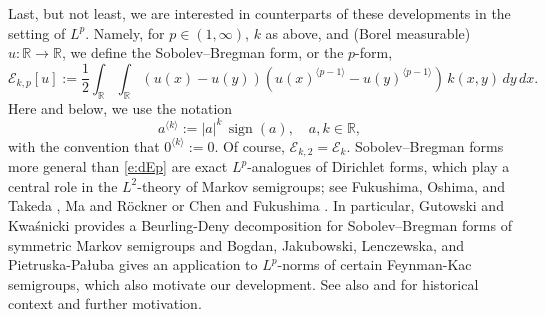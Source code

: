 \documentclass[12pt, a4paper]{amsart}
\DeclareMathOperator{\sign}{sign}
\newcommand{\R}{\mathbb{R}}
\newcommand{\E}{\mathcal{E}}
\begin{document}
Last, but not least, we are interested in counterparts of these developments in the setting of $L^p$. Namely,
for  $p \in (1, \infty)$, $k$ as above,  and (Borel measurable) $u: \R \to \R$,
we define the Sobolev--Bregman form, or the $p$-form,
\begin{equation}\label{e:dEp}
\E_{k, p}[u] :=
\frac{1}{2}
\int_{\R} \int_{\R} (u(x)-u(y)) (u(x)^{\langle p - 1 \rangle}  -u(y)^{\langle p - 1 \rangle} )\,k(x,y) \,dy \,dx.
\end{equation}
Here and below, we use the notation
\[
a^{\langle k \rangle} := |a|^k\, \sign(a), \quad a, k \in \mathbb{R},
\]
with the convention that \( 0^{\langle k \rangle} := 0 \). Of course, $\E_{k, 2}=\E_{k}$.
Sobolev--Bregman forms more general than \eqref{e:dEp} are exact \( L^p \)-analogues of Dirichlet forms, which play a central role in the \( L^2 \)-theory of Markov semigroups; see Fukushima, Oshima, and Takeda \cite{MR1303354}, Ma and Röckner \cite{MR1214375} or Chen and Fukushima \cite{MR2849840}.
In particular, Gutowski and Kwaśnicki \cite{MR4885983} provides a Beurling-Deny decomposition for Sobolev--Bregman forms of symmetric Markov semigroups and  Bogdan, Jakubowski, Lenczewska, and Pietruska-Pałuba \cite[Theorem 3]{MR4372148} gives an application to $L^p$-norms of certain Feynman-Kac semigroups, which also motivate our development. See also \cite[Subsection 1.3]{MR4372148} and \cite[Introduction]{MR4589708} for  historical context and further motivation.
\end{document}

